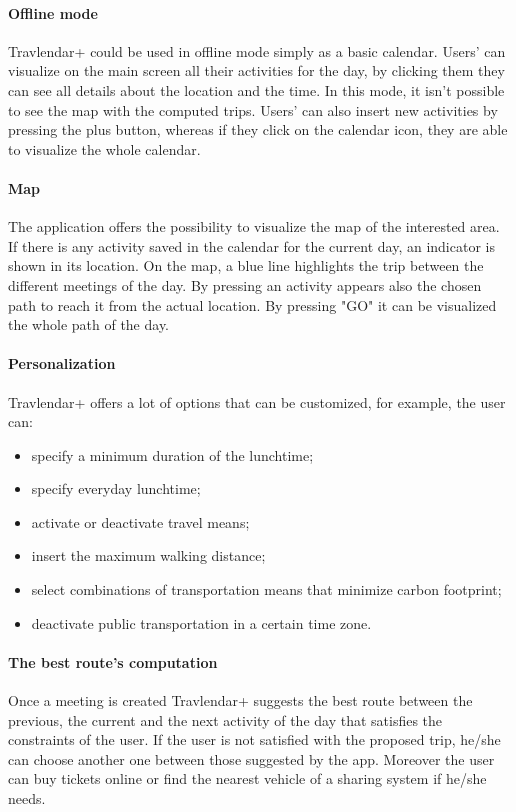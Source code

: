 \documentclass[12pt,titlepage]{article}
\begin{document}
\paragraph{Offline mode}
Travlendar+ could be used in offline mode simply as a basic calendar. Users' can visualize on the main screen all their activities for the day, by clicking them they can see all details about the location and the time. In this mode, it isn't possible to see the map with the computed trips. Users' can also insert new activities by pressing the plus button, whereas if they click on the calendar icon, they are able to visualize the whole calendar. 

\paragraph{Map}
The application offers the possibility to visualize the map of the interested area. If there is any activity saved in the calendar for the current day, an indicator is shown in its location. On the map, a blue line highlights the trip between the different meetings of the day. By pressing an activity appears also the chosen path to reach it from the actual location. By pressing "GO" it can be visualized the whole path of the day.

\paragraph{Personalization}
Travlendar+ offers a lot of options that can be customized, for example, the user can:
\begin{itemize}
\item{specify a minimum duration of the lunchtime;}
\item {specify everyday lunchtime;}
\item{activate or deactivate travel means;}
\item{insert the maximum walking distance;}
\item{select combinations of transportation means that minimize carbon footprint;}
\item{deactivate public transportation in a certain time zone.}
\end{itemize}

\paragraph{The best route's computation}
Once a meeting is created Travlendar+ suggests the best route between the previous, the current and the next activity of the day that satisfies the constraints of the user. If the user is not satisfied with the proposed trip, he/she can choose another one between those suggested by the app. Moreover the user can buy tickets online or find the nearest vehicle of a sharing system if he/she needs.
\end{document}

